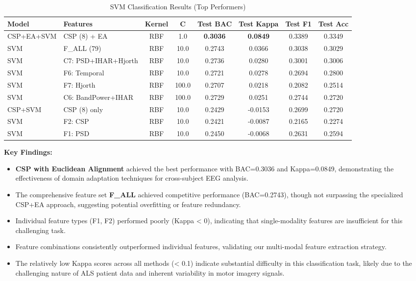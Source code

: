 \documentclass[conference]{IEEEtran}
\begin{document}
\begin{table}[htbp]
\centering
\caption{SVM Classification Results (Top Performers)}
\label{tab:svm_results}
\small
\begin{tabular}{llcccccc}
\toprule
\textbf{Model} & \textbf{Features} & \textbf{Kernel} & \textbf{C} & \textbf{Test BAC} & \textbf{Test Kappa} & \textbf{Test F1} & \textbf{Test Acc} \\
\midrule
CSP+EA+SVM & CSP (8) + EA & RBF & 1.0 & \textbf{0.3036} & \textbf{0.0849} & 0.3389 & 0.3349 \\
SVM & F\_ALL (79) & RBF & 10.0 & 0.2743 & 0.0366 & 0.3038 & 0.3029 \\
SVM & C7: PSD+IHAR+Hjorth & RBF & 10.0 & 0.2736 & 0.0280 & 0.3001 & 0.3006 \\
SVM & F6: Temporal & RBF & 10.0 & 0.2721 & 0.0278 & 0.2694 & 0.2800 \\
SVM & F7: Hjorth & RBF & 100.0 & 0.2707 & 0.0218 & 0.2082 & 0.2514 \\
SVM & C6: BandPower+IHAR & RBF & 100.0 & 0.2729 & 0.0251 & 0.2744 & 0.2720 \\
\midrule
CSP+SVM & CSP (8) only & RBF & 10.0 & 0.2429 & -0.0153 & 0.2699 & 0.2720 \\
SVM & F2: CSP & RBF & 10.0 & 0.2421 & -0.0087 & 0.2165 & 0.2274 \\
SVM & F1: PSD & RBF & 10.0 & 0.2450 & -0.0068 & 0.2631 & 0.2594 \\
\bottomrule
\end{tabular}
\end{table}

\textbf{Key Findings:}
\begin{itemize}
    \item \textbf{CSP with Euclidean Alignment} achieved the best performance with BAC=0.3036 and Kappa=0.0849, demonstrating the effectiveness of domain adaptation techniques for cross-subject EEG analysis.
    
    \item The comprehensive feature set \textbf{F\_ALL} achieved competitive performance (BAC=0.2743), though not surpassing the specialized CSP+EA approach, suggesting potential overfitting or feature redundancy.
    
    \item Individual feature types (F1, F2) performed poorly (Kappa < 0), indicating that single-modality features are insufficient for this challenging task.
    
    \item Feature combinations consistently outperformed individual features, validating our multi-modal feature extraction strategy.
    
    \item The relatively low Kappa scores across all methods (< 0.1) indicate substantial difficulty in this classification task, likely due to the challenging nature of ALS patient data and inherent variability in motor imagery signals.
\end{itemize}
\end{document}
